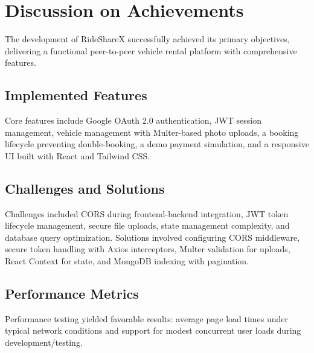 \chapter{Discussion on Achievements}

The development of RideShareX successfully achieved its primary objectives, delivering a functional peer-to-peer vehicle rental platform with comprehensive features.

\section{Implemented Features}
Core features include Google OAuth 2.0 authentication, JWT session management, vehicle management with Multer-based photo uploads, a booking lifecycle preventing double-booking, a demo payment simulation, and a responsive UI built with React and Tailwind CSS.

\section{Challenges and Solutions}
Challenges included CORS during frontend-backend integration, JWT token lifecycle management, secure file uploads, state management complexity, and database query optimization. Solutions involved configuring CORS middleware, secure token handling with Axios interceptors, Multer validation for uploads, React Context for state, and MongoDB indexing with pagination.

\section{Performance Metrics}
Performance testing yielded favorable results: average page load times under typical network conditions and support for modest concurrent user loads during development/testing.
